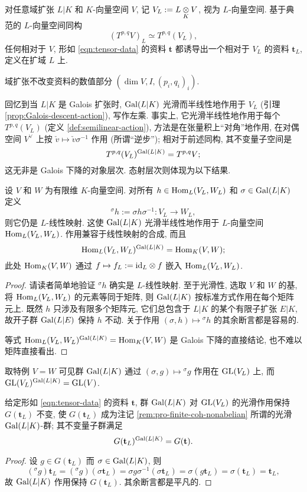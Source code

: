 \begin{definition}\label{def:tL}
	对任意域扩张 $L|K$ 和 $K$-向量空间 $V$, 记 $V_L := L \underset{K}{\otimes} V$, 视为 $L$-向量空间. 基于典范的 $L$-向量空间同构
	\[ (T^{p, q} V)_L \simeq T^{p, q}(V_L) , \]
	任何相对于 $V$, 形如 \eqref{eqn:tensor-data} 的资料 $\mathbf{t}$ 都诱导出一个相对于 $V_L$ 的资料 $\mathbf{t}_L$, 定义在扩域 $L$ 上.
\end{definition}

域扩张不改变资料的数值部分 $(\dim V, I, (p_i, q_i)_i)$.

回忆到当 $L|K$ 是 Galois 扩张时, $\operatorname{Gal}(L|K)$ 光滑而半线性地作用于 $V_L$ (引理 \ref{prop:Galois-descent-action}), 写作左乘. 事实上, 它光滑半线性地作用于每个 $T^{p, q} (V_L)$ (定义 \ref{def:semilinear-action}), 方法是在张量积上``对角''地作用, 在对偶空间 $V^\vee$ 上按 $\check{v} \mapsto \check{v} \sigma^{-1}$ 作用 (所谓``逆步''); 相对于前述同构, 其不变量子空间是
\[ T^{p, q} (V_L)^{\operatorname{Gal}(L|K)} = T^{p, q} V; \]
这无非是 Galois 下降的对象层次. 态射层次则体现为以下结果.

\begin{lemma}
	设 $V$ 和 $W$ 为有限维 $K$-向量空间. 对所有 $h \in \operatorname{Hom}_L(V_L, W_L)$ 和 $\sigma \in \operatorname{Gal}(L|K)$ 定义
	\[ {}^\sigma h := \sigma h \sigma^{-1} : V_L \to W_L, \]
	则它仍是 $L$-线性映射. 这使 $\operatorname{Gal}(L|K)$ 光滑半线性地作用于 $L$-向量空间 $\operatorname{Hom}_L(V_L, W_L)$. 作用兼容于线性映射的合成, 而且
	\[ \operatorname{Hom}_L(V_L, W_L)^{\operatorname{Gal}(L|K)} = \operatorname{Hom}_K(V, W); \]
	此处 $\operatorname{Hom}_K(V, W)$ 通过 $f \mapsto f_L := \mathrm{id}_L \otimes f$ 嵌入 $\operatorname{Hom}_L(V_L, W_L)$.
\end{lemma}
\begin{proof}
	请读者简单地验证 ${}^\sigma h$ 确实是 $L$-线性映射. 至于光滑性, 选取 $V$ 和 $W$ 的基, 将 $\operatorname{Hom}_L(V_L, W_L)$ 的元素等同于矩阵, 则 $\operatorname{Gal}(L|K)$ 按标准方式作用在每个矩阵元上. 既然 $h$ 只涉及有限多个矩阵元, 它们总包含于 $L|K$ 的某个有限子扩张 $E|K$, 故开子群 $\operatorname{Gal}(L|E)$ 保持 $h$ 不动. 关于作用 $(\sigma, h) \mapsto {}^\sigma h$ 的其余断言都是容易的.
	
	等式 $\operatorname{Hom}_L(V_L, W_L)^{\operatorname{Gal}(L|K)} = \operatorname{Hom}_K(V, W)$ 是 Galois 下降的直接结论, 也不难以矩阵直接看出.
\end{proof}

取特例 $V = W$ 可见群 $\operatorname{Gal}(L|K)$ 通过 $(\sigma, g) \mapsto {}^\sigma g$ 作用在 $\operatorname{GL}(V_L)$ 上, 而 $\operatorname{GL}(V_L)^{\operatorname{Gal}(L|K)} = \operatorname{GL}(V)$.

\begin{lemma}
	给定形如 \eqref{eqn:tensor-data} 的资料 $\mathbf{t}$, 群 $\operatorname{Gal}(L|K)$ 对 $\operatorname{GL}(V_L)$ 的光滑作用保持 $G(\mathbf{t}_L)$ 不变, 使 $G(\mathbf{t}_L)$ 成为注记 \ref{rem:pro-finite-coh-nonabelian} 所谓的光滑 $\operatorname{Gal}(L|K)$-群; 其不变量子群满足
	\[ G(\mathbf{t}_L)^{\operatorname{Gal}(L|K)} = G(\mathbf{t}). \]
\end{lemma}
\begin{proof}
	设 $g \in G(\mathbf{t}_L)$ 而 $\sigma \in \operatorname{Gal}(L|K)$, 则
	\[ ({}^\sigma g) \mathbf{t}_L = ({}^\sigma g) (\sigma \mathbf{t}_L) = \sigma g \sigma^{-1} (\sigma \mathbf{t}_L) = \sigma (g \mathbf{t}_L) = \sigma(\mathbf{t}_L) = \mathbf{t}_L, \]
	故 $\operatorname{Gal}(L|K)$ 作用保持 $G(\mathbf{t}_L)$. 其余断言都是平凡的.
\end{proof}

